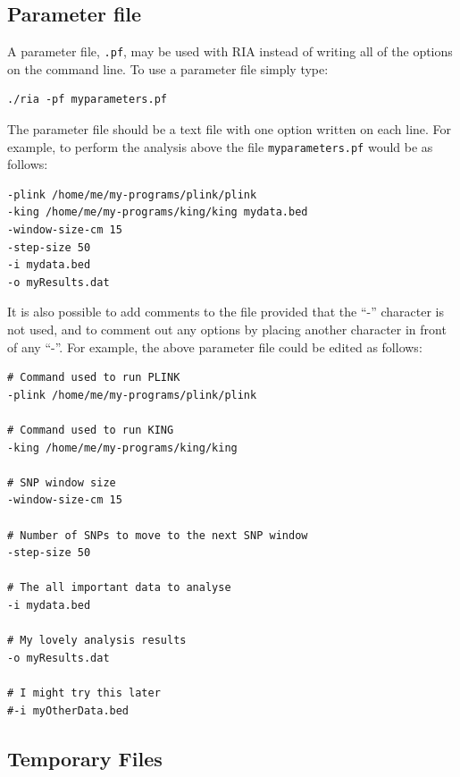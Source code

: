 \documentclass[a4paper,12pt]{article}
\newcommand{\code}[1]{{\footnotesize{{\tt #1}}}}
\begin{document}
\subsection{Parameter file}
\label{parameterfile}

A parameter file, \code{.pf}, may be used with RIA instead of writing all of the options on the command line. To use a parameter file simply type: 
\vspace{0.35cm} \begin{lstlisting}
./ria -pf myparameters.pf

\end{lstlisting} \vspace{0.35cm}
The parameter file should be a text file with one option written on each line. For example, to perform the analysis above the file \code{myparameters.pf} would be as follows: 
\vspace{0.35cm} \begin{lstlisting}
-plink /home/me/my-programs/plink/plink
-king /home/me/my-programs/king/king mydata.bed
-window-size-cm 15
-step-size 50
-i mydata.bed
-o myResults.dat

\end{lstlisting} \vspace{0.35cm}
It is also possible to add comments to the file provided that the ``-'' character is not used, and to comment out any options by placing another character in front of any ``-''. For example, the above parameter file could be edited as follows: 
\vspace{0.35cm} \begin{lstlisting}
# Command used to run PLINK
-plink /home/me/my-programs/plink/plink

# Command used to run KING
-king /home/me/my-programs/king/king

# SNP window size
-window-size-cm 15

# Number of SNPs to move to the next SNP window
-step-size 50

# The all important data to analyse
-i mydata.bed

# My lovely analysis results
-o myResults.dat

# I might try this later
#-i myOtherData.bed

\end{lstlisting} \vspace{0.35cm}

\subsection{Temporary Files}
\label{temporary}
\end{document}
